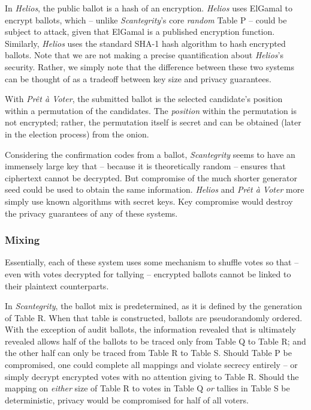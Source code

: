 \documentclass[10pt,twocolumn]{article}
\newcommand{\term}[1]{\textit{#1}}
\newcommand{\preta}{Pr\^{e}t \`{a}}
\newcommand{\pv}{\preta{} Voter}
\begin{document}
In \term{Helios}, the public ballot is a hash of an encryption. \term{Helios} uses ElGamal to encrypt ballots,
which -- unlike \term{Scantegrity}'s core \emph{random} Table P -- could be subject to attack, given that
ElGamal is a published encryption function. Similarly, \term{Helios} uses the standard SHA-1 hash algorithm
to hash encrypted ballots. Note that we are not making a precise quantification about \term{Helios}'s
security. Rather, we simply note that the difference between these two systems can be thought of as
a tradeoff between key size and privacy guarantees.

With \term{\pv{}}, the submitted ballot is the selected candidate's position within a permutation of
the candidates. The \emph{position} within the permutation is not encrypted; rather, the permutation
itself is secret and can be obtained (later in the election process) from the onion.

Considering the confirmation codes from a ballot, \term{Scantegrity} seems to have an immensely
large key that -- because it is theoretically random -- ensures that ciphertext cannot be decrypted.
But compromise of the much shorter generator seed could be used to obtain the same information.
\term{Helios} and \term{\pv{}} more simply use known algorithms with secret keys. Key compromise
would destroy the privacy guarantees of any of these systems.

\subsubsection{Mixing}

Essentially, each of these system uses some mechanism to shuffle votes so that -- even
with votes decrypted for tallying -- encrypted ballots cannot be linked to their plaintext
counterparts.

In \term{Scantegrity}, the ballot mix is predetermined, as it is defined by the generation of Table R.
When that table is constructed, ballots are pseudorandomly ordered. With the exception of audit
ballots, the information revealed that is ultimately revealed allows half of the ballots to be
traced only from Table Q to Table R; and the other half can only be traced from Table R to Table S.
Should Table P be compromised, one could complete all mappings and violate secrecy entirely -- or
simply decrypt encrypted votes with no attention giving to Table R. Should the mapping on
\emph{either} size of Table R to votes in Table Q \emph{or} tallies in Table S be deterministic,
privacy would be compromised for half of all voters.
\end{document}
